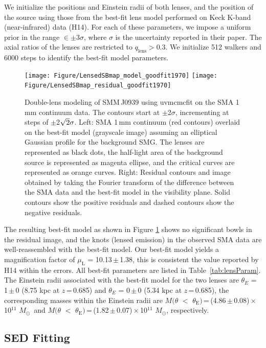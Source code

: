 \documentclass[twocolumn,apj,numberedappendix]{emulateapj}
\newcommand{\Msun}{\mbox{$M_{\odot}$}}
\begin{document}
We initialize the positions and Einstein radii of both lenses, and the position of the source using those
 from the best-fit lens model performed on Keck K-band (near-infrared) data (H14). For each of
these parameters, we impose a uniform prior in the range $\in\pm$3$\sigma$, where $\sigma$ is the uncertainty
reported in their paper. The axial ratios of the lenses are restricted to $q_\textrm{lens} > 0.3$. We initialize 512
walkers and 6000 steps to identify the best-fit model parameters.
\begin{figure}[!tbpH]
\centering
\texttt{[image: Figure/LensedSBmap\_model\_goodfit1970]}
\texttt{[image: Figure/LensedSBmap\_residual\_goodfit1970]}
\caption{Double-lens modeling of SMM\,J0939 using {\sc uvmcmcfit} on the SMA 1\,mm continuum data.
The contours start at $\pm$2$\sigma$, incrementing at
steps of $\pm$2$\sqrt{\rm 2}\sigma$. Left: SMA 1\,mm continuum (red contours) overlaid on the best-fit model (grayscale image) assuming an elliptical Gaussian profile for the background SMG. The lenses are represented as black dots, the half-light area of the background source is represented as magenta ellipse, and the critical curves are represented as orange curves.
Right: Residual contours and image obtained by taking the Fourier transform of the difference between the SMA data and the best-fit model in the visibility plane. Solid contours show the positive residuals and dashed contours
show the negative residuals.
\label{fig:lens}}
\end{figure}

The resulting best-fit model as shown in Figure\,\,\ref{fig:lens} shows no significant bowls in the residual
image, and the knots (lensed emission) in the observed SMA data are well-reassembled with the best-fit model.
Our best-fit model yields a magnification
factor of $\mu_\textrm{L}$ = 10.13\,$\pm$\,1.38, this is consistent the value reported by H14 within the errors. All best-fit
parameters are listed in Table~\ref{tab:lensParam}. The Einstein radii associated with the best-fit model for the two lenses are $\theta_{E}$ = 1\,$\pm$\,0 (8.75 kpc at $z$\,=\,0.685) and $\theta_{E}$ = 0\,$\pm$\,0 (5.34\,\,kpc at $z$\,=\,0.685),
the corresponding masses within the Einstein radii are $M(\theta$\,\,$<$\,\,$\theta_\textrm{E})$\,=\,(4.86\,$\pm$\,0.08)\,$\times$\,10$^{11}$\,\,\Msun\ and $M(\theta$\,\,$<$\,\,$\theta_\textrm{E})$\,=\,(1.82\,$\pm$\,0.07)\,$\times$\,10$^{11}$\,\,\Msun, respectively.


\subsection{SED Fitting} \label{sec:SED}
\end{document}
